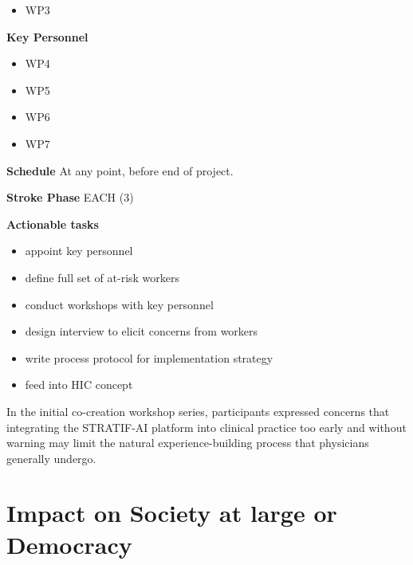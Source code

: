 \documentclass[
  letterpaper,
  DIV=11,
  numbers=noendperiod]{scrreport}
\providecommand{\tightlist}{%
  \setlength{\itemsep}{0pt}\setlength{\parskip}{0pt}}\usepackage{longtable,booktabs,array}
\begin{document}
\begin{itemize}
\tightlist
\item
  WP3
\end{itemize}

\textbf{Key Personnel}

\begin{itemize}
\tightlist
\item
  WP4
\item
  WP5
\item
  WP6
\item
  WP7
\end{itemize}

\textbf{Schedule} At any point, before end of project.

\textbf{Stroke Phase} EACH (3)

\textbf{Actionable tasks}

\begin{itemize}
\tightlist
\item
  appoint key personnel
\item
  define full set of at-risk workers
\item
  conduct workshops with key personnel
\item
  design interview to elicit concerns from workers
\item
  write process protocol for implementation strategy
\item
  feed into HIC concept
\end{itemize}

\begin{tcolorbox}[enhanced jigsaw, arc=.35mm, breakable, coltitle=black, toptitle=1mm, colbacktitle=quarto-callout-note-color!10!white, toprule=.15mm, left=2mm, bottomrule=.15mm, opacitybacktitle=0.6, titlerule=0mm, colback=white, opacityback=0, title=\textcolor{quarto-callout-note-color}{\faInfo}\hspace{0.5em}{Note}, bottomtitle=1mm, colframe=quarto-callout-note-color-frame, leftrule=.75mm, rightrule=.15mm]

In the initial co-creation workshop series, participants expressed
concerns that integrating the STRATIF-AI platform into clinical practice
too early and without warning may limit the natural experience-building
process that physicians generally undergo.

\end{tcolorbox}

\hypertarget{impact-on-society-at-large-or-democracy}{%
\section{Impact on Society at large or
Democracy}\label{impact-on-society-at-large-or-democracy}}
\end{document}
